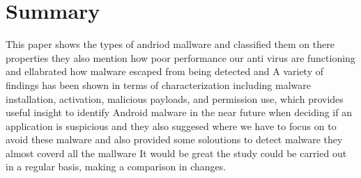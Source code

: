 \documentclass[10pt]{article}
\begin{document}
\section {Summary}


This paper shows the types of andriod mallware and classified them on there properties  they also mention how poor performance our anti virus are functioning and ellabrated how malware escaped from being detected and  A variety of findings has been shown in terms of characterization including malware installation, activation, malicious payloads, and permission use, which provides useful insight to identify Android malware in the near future when deciding if an application is suspicious and they also suggesed  where we have to focus on to avoid these malware and also provided some soloutions to detect malware 
they almost coverd all the mallware  It would be great the study could be carried out in a regular basis, making a comparison in changes.\\
\end{document}
